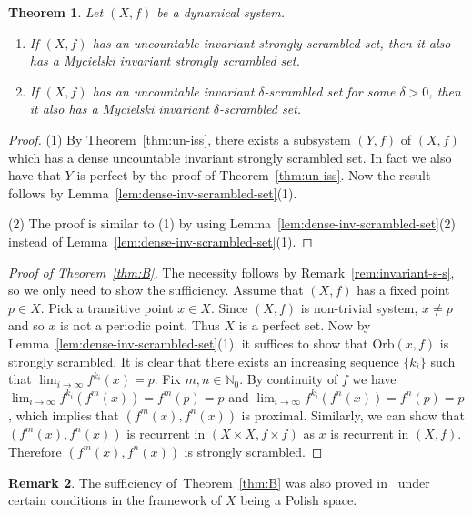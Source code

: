 \documentclass[reqno,a4paper,12pt]{amsart}
\newtheorem{thm}{Theorem}[section]
\theoremstyle{definition}
\newtheorem{rem}[thm]{Remark}
\numberwithin{equation}{section}
\begin{document}
\begin{thm}\label{thm:uncountable-to-Mycielski}
Let $(X,f)$ be a dynamical system.
\begin{enumerate}
\item If $(X,f)$ has an uncountable invariant strongly scrambled set, then
it also has a Mycielski invariant strongly scrambled set.
\item If $(X,f)$ has an uncountable invariant $\delta$-scrambled set for some $\delta>0$,
then it also has a Mycielski invariant $\delta$-scrambled set.
\end{enumerate}
\end{thm}
\begin{proof}
(1)
By Theorem~\ref{thm:un-iss},
there exists a subsystem $(Y,f)$ of $(X,f)$ which has a dense uncountable invariant strongly scrambled set.
In fact we also have that $Y$ is perfect by the proof of Theorem~\ref{thm:un-iss}.
Now the result follows by Lemma~\ref{lem:dense-inv-scrambled-set}(1).

(2) The proof is similar to (1)
by using Lemma~\ref{lem:dense-inv-scrambled-set}(2) instead of Lemma~\ref{lem:dense-inv-scrambled-set}(1).
\end{proof}

\begin{proof}[Proof of Theorem~\ref{thm:B}]
The necessity follows by Remark~\ref{rem:invariant-s-s}, so we only need
to show the sufficiency. Assume that $(X,f)$ has a fixed point $p\in X$. Pick a transitive point $x\in X$.
Since $(X,f)$ is non-trivial system, $x\neq p$ and so $x$ is not a periodic point. Thus $X$ is a perfect set.
Now by Lemma~\ref{lem:dense-inv-scrambled-set}(1),
it suffices to show that ${\mbox{Orb}}(x,f)$ is strongly scrambled.
It is clear that there exists an increasing sequence $\{k_i\}$
such that $\lim_{i\to\infty}f^{k_i}(x)=p$.
Fix $m,n\in{\mathbb{N}}_0$. By continuity of $f$ we have $\lim_{i\to\infty}f^{k_i}(f^m(x))=f^m(p)=p$ and $\lim_{i\to\infty}f^{k_i}(f^n(x))=f^n(p)=p$,
which implies that $(f^m(x),f^n(x))$ is proximal.
Similarly, we can show that $(f^m(x),f^n(x))$ is recurrent in $(X\times X,f\times f)$
as $x$ is recurrent in $(X,f)$.
Therefore $(f^m(x),f^n(x))$ is strongly scrambled.
\end{proof}

\begin{rem}
The sufficiency of~Theorem~\ref{thm:B} was also proved in~\cite{YL09} under certain conditions
in the framework of $X$ being a Polish space.
\end{rem}
\end{document}

